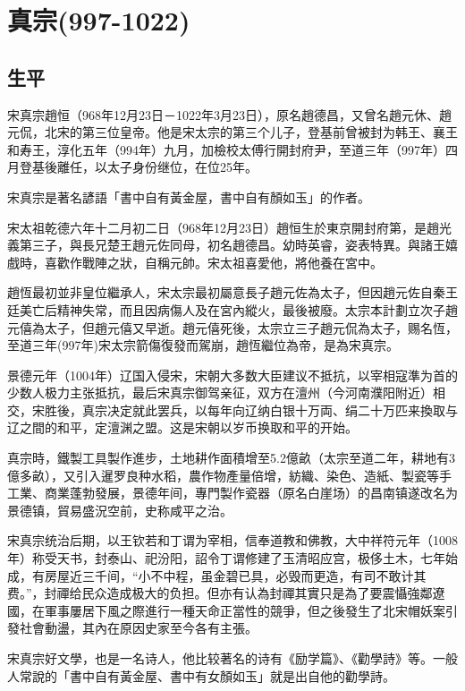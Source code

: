 
\section{真宗\tiny(997-1022)}

\subsection{生平}

宋真宗趙恒（968年12月23日－1022年3月23日），原名趙德昌，又曾名趙元休、趙元侃，北宋的第三位皇帝。他是宋太宗的第三个儿子，登基前曾被封为韩王、襄王和寿王，淳化五年（994年）九月，加檢校太傅行開封府尹，至道三年（997年）四月登基後離任，以太子身份继位，在位25年。

宋真宗是著名諺語「書中自有黃金屋，書中自有顏如玉」的作者。

宋太祖乾德六年十二月初二日（968年12月23日）趙恒生於東京開封府第，是趙光義第三子，與長兄楚王趙元佐同母，初名趙德昌。幼時英睿，姿表特異。與諸王嬉戲時，喜歡作戰陣之狀，自稱元帥。宋太祖喜愛他，將他養在宮中。

趙恆最初並非皇位繼承人，宋太宗最初屬意長子趙元佐為太子，但因趙元佐自秦王廷美亡后精神失常，而且因病傷人及在宮內縱火，最後被廢。太宗本計劃立次子趙元僖為太子，但趙元僖又早逝。趙元僖死後，太宗立三子趙元侃為太子，赐名恆，至道三年(997年)宋太宗箭傷復發而駕崩，趙恆繼位為帝，是為宋真宗。

景德元年（1004年）辽国入侵宋，宋朝大多数大臣建议不抵抗，以宰相寇準为首的少数人极力主张抵抗，最后宋真宗御驾亲征，双方在澶州（今河南濮阳附近）相交，宋胜後，真宗决定就此罢兵，以每年向辽纳白银十万両、绢二十万匹来換取与辽之間的和平，定澶渊之盟。这是宋朝以岁币换取和平的开始。

真宗時，鐵製工具製作進步，土地耕作面積增至5.2億畝（太宗至道二年，耕地有3億多畝），又引入暹罗良种水稻，農作物產量倍增，紡織、染色、造紙、製瓷等手工業、商業蓬勃發展，景德年间，專門製作瓷器（原名白崖场）的昌南镇遂改名为景德镇，貿易盛況空前，史称咸平之治。

宋真宗统治后期，以王钦若和丁谓为宰相，信奉道教和佛教，大中祥符元年（1008年）称受天书，封泰山、祀汾阳，詔令丁谓修建了玉清昭应宫，极侈土木，七年始成，有房屋近三千间，“小不中程，虽金碧已具，必毁而更造，有司不敢计其费。”，封禪给民众造成极大的负担。但亦有认為封禪其實只是為了要震懾強鄰遼國，在軍事屢居下風之際進行一種天命正當性的競爭，但之後發生了北宋帽妖案引發社會動盪，其內在原因史家至今各有主張。

宋真宗好文學，也是一名诗人，他比较著名的诗有《励学篇》、《勸學詩》等。一般人常說的「書中自有黃金屋、書中有女顏如玉」就是出自他的勸學詩。


